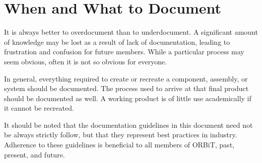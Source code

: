 \documentclass[12pt,article]{memoir}
\begin{document}
\newpage

\chapter{When and What to Document}
It is always better to overdocument than to underdocument. A significant amount of knowledge may be lost as a result of lack of documentation, leading to frustration and confusion for future members. While a particular process may seem obvious, often it is not so obvious for everyone.\par
In general, everything required to create or recreate a component, assembly, or system should be documented. The process used to arrive at that final product should be documented as well. A working product is of little use academically if it cannot be recreated.\par
It should be noted that the documentation guidelines in this document need not be always strictly follow, but that they represent best practices in industry. Adherence to these guidelines is beneficial to all members of ORBiT, past, present, and future.

\end{document}
